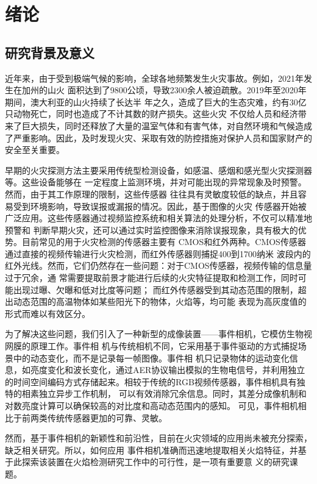 
\chapter{绪论}

\section{研究背景及意义}

近年来，由于受到极端气候的影响，全球各地频繁发生火灾事故。例如，2021年发生在加州的山火
面积达到了9800公顷，导致2300余人被迫疏散。2019年至2020年期间，澳大利亚的山火持续了长达半
年之久，造成了巨大的生态灾难，约有30亿只动物死亡，同时也造成了不计其数的财产损失。这些火灾
不仅给人员和经济带来了巨大损失，同时还释放了大量的温室气体和有害气体，对自然环境和气候造成
了严重影响。因此，及时发现火灾、采取有效的防控措施对保护人员和国家财产的安全至关重要。

早期的火灾探测方法主要采用传统型检测设备，如感温、感烟和感光型火灾探测器等。这些设备能够在
一定程度上监测环境，并对可能出现的异常现象及时预警。然而，由于其工作原理的限制，这些传感器
往往具有灵敏度较低的缺点，并且容易受到环境影响，导致误报或漏报的情况。因此，基于图像的火灾
传感器开始被广泛应用。这些传感器通过视频监控系统和相关算法的处理分析，不仅可以精准地预警和
判断早期火灾，还可以通过实时监控图像来消除误报现象，具有极大的优势。目前常见的用于火灾检测的传感器主要有
CMOS和红外两种。CMOS传感器通过直接的视频传输进行火灾检测，而红外传感器则捕捉400到1700纳米
波段内的红外光线。然而，它们仍然存在一些问题：对于CMOS传感器，视频传输的信息量过于冗余，通
常需要提取前景才能进行后续的火灾特征提取和检测工作，同时可能出现过曝、欠曝和低对比度等问题；
而红外传感器受到其动态范围的限制，超出动态范围的高温物体如某些阳光下的物体，火焰等，均可能
表现为高灰度值的形式而难以有效区分。

为了解决这些问题，我们引入了一种新型的成像装置——事件相机，它模仿生物视网膜的原理工作\cite{gallego2020event,posch2014retinomorphic}。事件相
机与传统相机不同，它采用基于事件驱动的方式捕捉场景中的动态变化，而不是记录每一帧图像。事件相
机只记录物体的运动变化信息，如亮度变化和波长变化，通过AER协议\cite{rivas2005tools}输出模拟的生物电信号，并利用独立
的时间空间编码方式存储起来。相较于传统的RGB视频传感器，事件相机具有独特的相素独立异步工作机制，
可以有效消除冗余信息。同时，其差分成像机制和对数亮度计算可以确保较高的对比度和高动态范围内的感知。
可见，事件相机相比于前两类传统传感器更加的可靠、灵敏。

然而，基于事件相机的新颖性和前沿性，目前在火灾领域的应用尚未被充分探索，缺乏相关研究。所以，如何应用
事件相机准确而迅速地提取相关火焰特征，并基于此探索该装置在火焰检测研究工作中的可行性，是一项有重要意
义的研究课题。

